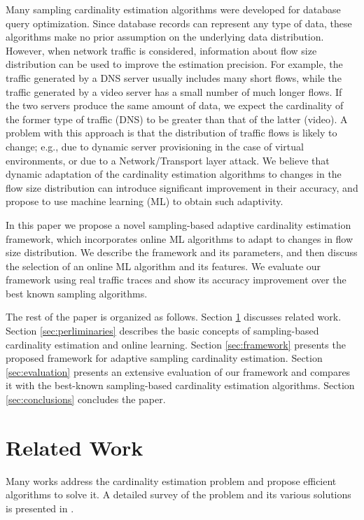 	Many sampling cardinality estimation algorithms were developed for database query optimization. Since database records can represent any type of data, these algorithms make no prior assumption on the underlying data distribution. However, when network traffic is considered, information about flow size distribution can be used to improve the estimation precision. For example, the traffic generated by a DNS server usually includes many short flows, while the traffic generated by a video server has a small number of much longer flows. If the two servers produce the same amount of data, we expect the cardinality of the former type of traffic (DNS) to be greater than that of the latter (video). A problem with this approach is that the distribution of traffic flows is likely to change; e.g., due to dynamic server provisioning in the case of virtual environments, or due to a Network/Transport layer attack. We believe that dynamic adaptation of the cardinality estimation algorithms to changes in the flow size distribution can introduce significant improvement in their accuracy, and propose to use machine learning (ML) to obtain such adaptivity.
	
	In this paper we propose a novel sampling-based adaptive cardinality estimation framework, which incorporates online ML algorithms to adapt to changes in flow size distribution. We describe the framework and its parameters, and then discuss the selection of an online ML algorithm and its features. We evaluate our framework using real traffic traces and show its accuracy improvement over the best known sampling algorithms.
	
	The rest of the paper is organized as follows. Section \ref{sec:related} discusses related work. Section \ref{sec:perliminaries} describes the basic concepts of sampling-based cardinality estimation and online learning. Section \ref{sec:framework} presents the proposed framework for adaptive sampling cardinality estimation. Section \ref{sec:evaluation} presents an extensive evaluation of our framework and compares it with the best-known sampling-based cardinality estimation algorithms. Section \ref{sec:conclusions} concludes the paper.
	
\section{Related Work} \label{sec:related}

	Many works address the cardinality estimation problem and propose efficient algorithms to solve it. A detailed survey of the problem and its various solutions is presented in \cite{gibbons2016distinct}. 
	
